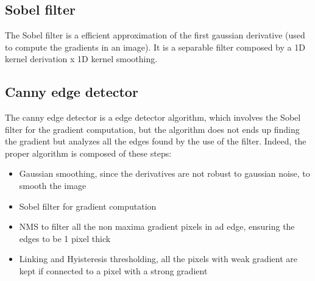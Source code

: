 
\section[Question -- {\it Sobel filter vs Canny edge detector}]{}

\subsection{Sobel filter}
The Sobel filter is a efficient approximation of the first gaussian derivative (used to compute the gradients
in an image). It is a separable filter composed by a 1D kernel derivation x 1D kernel smoothing. 

\subsection{Canny edge detector}
The canny edge detector is a edge detector algorithm, which involves the Sobel filter for the gradient computation, but the
algorithm does not ends up finding the gradient but analyzes all the edges found by the use of the filter.
Indeed, the proper algorithm is composed of these steps:
\begin{itemize}
    \item Gaussian smoothing, since the derivatives are not robust to gaussian noise, to smooth the image
    \item Sobel filter for gradient computation
    \item NMS to filter all the non maxima gradient pixels in ad edge, ensuring the edges to be 1 pixel thick
    \item Linking and Hyisteresis thresholding, all the pixels with weak gradient are kept if connected to a pixel with a strong gradient
\end{itemize}
